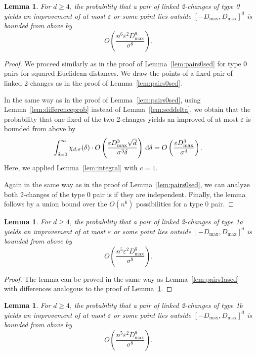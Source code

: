 \documentclass[11pt,DIV=12,a4paper]{scrartcl}
\newtheorem{lemma}[claim]{Lemma}
\newcommand{\eps}{\varepsilon}
\newcommand{\maxx}{D_{\max}}
\begin{document}
\begin{lemma}
\label{lem:euc0}
For $d \geq 4$, the probability that a pair of linked 2-changes of type 0 yields an improvement of at most
$\eps$ or some point lies outside $[-\maxx, \maxx]^d$ is bounded from above by
\[
O\left(\frac{n^6 \eps^2 \maxx^6}{\sigma^8}\right).
\]
\end{lemma}
\begin{proof}
We proceed similarly as in the proof of Lemma~\ref{lem:pairs0sed} for type 0 pairs for squared Euclidean distances.
We draw the points of a fixed pair of linked 2-changes as in the proof of Lemma~\ref{lem:pairs0sed}.

In the same way as in the proof of Lemma~\ref{lem:pairs0sed}, using Lemma~\ref{lem:differenceprob} instead of Lemma~\ref{lem:seddelta}, we obtain
that the probability that one fixed of the
two 2-changes yields an improved of at most $\eps$ is bounded from above by
\[
 \int_{\delta = 0}^\infty \chi_{d, \sigma}(\delta) \cdot 
 O\left(\frac{\eps \maxx^3 \sqrt d}{\sigma^3 \delta} \right) \, \textup d \delta
  = O\left(\frac{\eps \maxx^3}{\sigma^4} \right).
\]
Here, we applied Lemma~\ref{lem:integral} with $c = 1$.

Again in the same way as in the proof of Lemma~\ref{lem:pairs0sed}, we can analyze both 2-changes of the type 0 pair
is if they are independent. Finally, the lemma follows by a union bound over the $O(n^6)$ possibilities for a type 0 pair.
\end{proof}


\begin{lemma}
\label{lem:euc1a}
For $d \geq 4$, the probability that a pair of linked 2-changes of type 1a yields an improvement of at most
$\eps$ or some point lies outside $[-\maxx, \maxx]^d$ is bounded from above by
\[
O\left(\frac{n^5 \eps^2 \maxx^6}{\sigma^8}\right).
\]
\end{lemma}

\begin{proof}
The lemma can be proved in the same way as Lemma~\ref{lem:pairs1ased} with differences analogous to the proof of Lemma~\ref{lem:euc0}.
\end{proof}

\begin{lemma}
\label{lem:euc1b}
For $d \geq 4$, the probability that a pair of linked 2-changes of type 1b yields an improvement of at most
$\eps$ or some point lies outside $[-\maxx, \maxx]^d$ is bounded from above by
\[
O\left(\frac{n^5 \eps^2 \maxx^6}{\sigma^8}\right) .
\]
\end{lemma}
\end{document}
